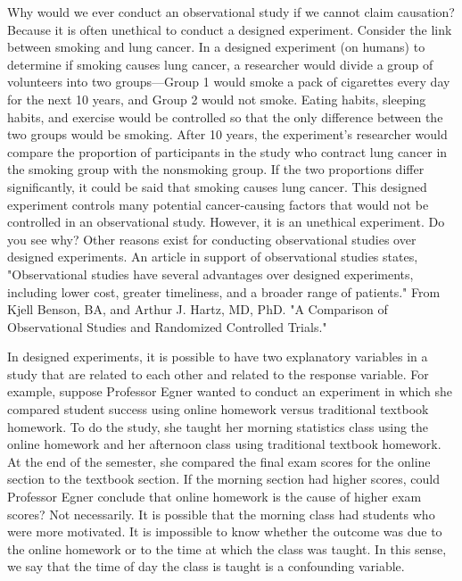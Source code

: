 \documentclass{report}
\begin{document}
        \bigbreak \noindent 

        \bigbreak \noindent 
        Why would we ever conduct an observational study if we cannot claim causation? Because it is often unethical to conduct a designed experiment.
        \bigbreak \noindent 
        Consider the link between smoking and lung cancer. In a designed experiment (on humans) to determine if smoking causes lung cancer, a researcher would divide a group of volunteers into two groups—Group 1 would smoke a pack of cigarettes every day for the next 10 years, and Group 2 would not smoke. Eating habits, sleeping habits, and exercise would be controlled so that the only difference between the two groups would be smoking. After 10 years, the experiment's researcher would compare the proportion of participants in the study who contract lung cancer in the smoking group with the nonsmoking group. If the two proportions differ significantly, it could be said that smoking causes lung cancer. This designed experiment controls many potential cancer-causing factors that would not be controlled in an observational study. However, it is an unethical experiment. Do you see why?
        \bigbreak \noindent Other reasons exist for conducting observational studies over designed experiments. An article in support of observational studies states, "Observational studies have several advantages over designed experiments, including lower cost, greater timeliness, and a broader range of patients." From Kjell Benson, BA, and Arthur J. Hartz, MD, PhD. "A Comparison of Observational Studies and Randomized Controlled Trials." 

        \bigbreak \noindent 
        In designed experiments, it is possible to have two explanatory variables in a study that are related to each other and related to the response variable. For example, suppose Professor Egner wanted to conduct an experiment in which she compared student success using online homework versus traditional textbook homework. To do the study, she taught her morning statistics class using the online homework and her afternoon class using traditional textbook homework. At the end of the semester, she compared the final exam scores for the online section to the textbook section. If the morning section had higher scores, could Professor Egner conclude that online homework is the cause of higher exam scores? Not necessarily. It is possible that the morning class had students who were more motivated. It is impossible to know whether the outcome was due to the online homework or to the time at which the class was taught. In this sense, we say that the time of day the class is taught is a confounding variable.
\end{document}
